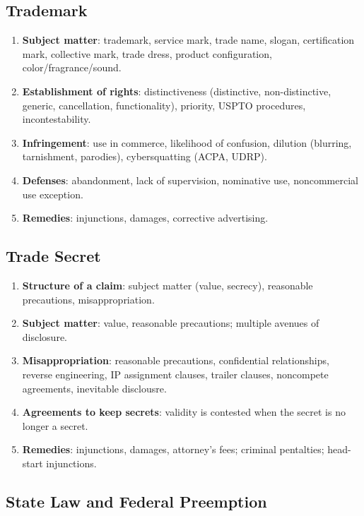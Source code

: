 \subsection{Trademark}

\begin{enumerate}
    \item \textbf{Subject matter}: trademark, service mark, trade name, 
    slogan, certification mark, collective mark, trade dress, product 
    configuration, color/fragrance/sound.
    \item \textbf{Establishment of rights}: distinctiveness (distinctive, 
    non-distinctive, generic, cancellation, functionality), priority, USPTO 
    procedures, incontestability.
    \item \textbf{Infringement}: use in commerce, likelihood of confusion, 
    dilution (blurring, tarnishment, parodies), cybersquatting (ACPA, UDRP).
    \item \textbf{Defenses}: abandonment, lack of supervision, nominative use, 
    noncommercial use exception.
    \item \textbf{Remedies}: injunctions, damages, corrective advertising.
\end{enumerate}

\subsection{Trade Secret}

\begin{enumerate}
    \item \textbf{Structure of a claim}: subject matter (value, secrecy), 
    reasonable precautions, misappropriation.
    \item \textbf{Subject matter}: value, reasonable precautions; multiple 
    avenues of disclosure.
    \item \textbf{Misappropriation}: reasonable precautions, confidential 
    relationships, reverse engineering, IP assignment clauses, trailer 
    clauses, noncompete agreements, inevitable disclousre.
    \item \textbf{Agreements to keep secrets}: validity is contested when the 
    secret is no longer a secret.
    \item \textbf{Remedies}: injunctions, damages, attorney's fees; criminal 
    pentalties; head-start injunctions.
\end{enumerate}

\subsection{State Law and Federal Preemption}

